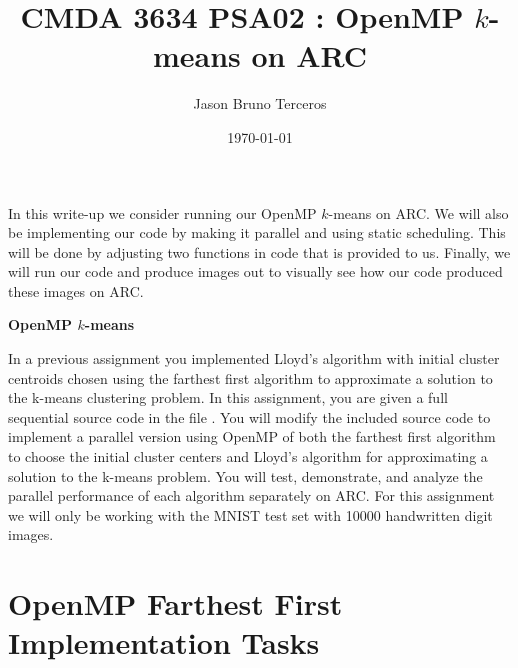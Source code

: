 \documentclass[12pt]{article}
\title{CMDA 3634 PSA02 : OpenMP $k$-means on ARC}
\author{Jason Bruno Terceros}
\date{\today}
\begin{document}
\maketitle

In this write-up we consider running our OpenMP $k$-means on ARC. We will also be implementing our code by making it parallel and using static scheduling. This will be done by adjusting two functions in code that is provided to us. Finally, we will run our code and produce images out to visually see how our code produced these images on ARC.

\textbf{OpenMP $k$-means}

In a previous assignment you implemented Lloyd’s algorithm with initial cluster centroids chosen using the farthest first algorithm to approximate a solution to the k-means clustering problem. In this assignment, you are given a full sequential source code in the file . You will modify the included source code to implement a parallel version using OpenMP of both the farthest first algorithm to choose the initial cluster centers and Lloyd’s algorithm for approximating a solution to the k-means problem. You will test, demonstrate, and analyze the parallel performance of each algorithm separately on ARC. For this assignment we will only be working with the MNIST test set with 10000 handwritten digit images.


\section{OpenMP Farthest First Implementation Tasks}
\end{document}
